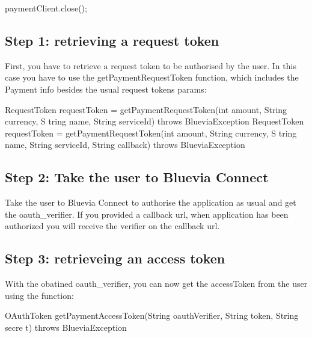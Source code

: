 \begin{DoxyCode}
paymentClient.close();
\end{DoxyCode}
\hypertarget{blv_payment_guide_retrieving_payment_request_token_sec}{}\subsection{Step 1: retrieving a request token}\label{blv_payment_guide_retrieving_payment_request_token_sec}
First, you have to retrieve a request token to be authorised by the user. In this case you have to use the getPaymentRequestToken function, which includes the Payment info besides the usual request tokens params:


\begin{DoxyCode}
RequestToken requestToken = getPaymentRequestToken(int amount, String currency, S
      tring name, String serviceId) throws BlueviaException
RequestToken requestToken = getPaymentRequestToken(int amount, String currency, S
      tring name, String serviceId, String callback) throws BlueviaException
\end{DoxyCode}
\hypertarget{blv_payment_guide_retrieving_payment_verification_sec}{}\subsection{Step 2: Take the user to Bluevia Connect}\label{blv_payment_guide_retrieving_payment_verification_sec}
Take the user to Bluevia Connect to authorise the application as usual and get the oauth\_\-verifier. If you provided a callback url, when application has been authorized you will receive the verifier on the callback url.\hypertarget{blv_payment_guide_retrieving_payment_access_token_sec}{}\subsection{Step 3: retrieveing an access token}\label{blv_payment_guide_retrieving_payment_access_token_sec}
With the obatined oauth\_\-verifier, you can now get the accessToken from the user using the function:


\begin{DoxyCode}
OAuthToken getPaymentAccessToken(String oauthVerifier, String token, String secre
      t) throws BlueviaException
\end{DoxyCode}


